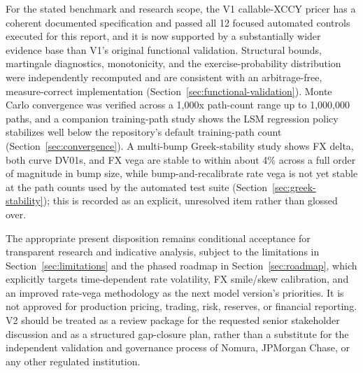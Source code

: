 \documentclass[conference]{IEEEtran}
\begin{document}
For the stated benchmark and research scope, the V1 callable-XCCY pricer has a coherent documented specification and passed all 12 focused automated controls executed for this report, and it is now supported by a substantially wider evidence base than V1's original functional validation. Structural bounds, martingale diagnostics, monotonicity, and the exercise-probability distribution were independently recomputed and are consistent with an arbitrage-free, measure-correct implementation (Section~\ref{sec:functional-validation}). Monte Carlo convergence was verified across a 1,000x path-count range up to 1,000,000 paths, and a companion training-path study shows the LSM regression policy stabilizes well below the repository's default training-path count (Section~\ref{sec:convergence}). A multi-bump Greek-stability study shows FX delta, both curve DV01s, and FX vega are stable to within about 4\% across a full order of magnitude in bump size, while bump-and-recalibrate rate vega is not yet stable at the path counts used by the automated test suite (Section~\ref{sec:greek-stability}); this is recorded as an explicit, unresolved item rather than glossed over.

The appropriate present disposition remains conditional acceptance for transparent research and indicative analysis, subject to the limitations in Section~\ref{sec:limitations} and the phased roadmap in Section~\ref{sec:roadmap}, which explicitly targets time-dependent rate volatility, FX smile/skew calibration, and an improved rate-vega methodology as the next model version's priorities. It is not approved for production pricing, trading, risk, reserves, or financial reporting. V2 should be treated as a review package for the requested senior stakeholder discussion and as a structured gap-closure plan, rather than a substitute for the independent validation and governance process of Nomura, JPMorgan Chase, or any other regulated institution.
\end{document}
